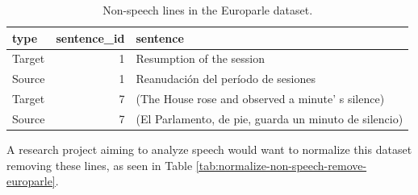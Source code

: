 \documentclass[
]{article}
\begin{document}
\begin{table}

\caption{\label{tab:normalize-non-speech-identify-europarle}Non-speech lines in the Europarle dataset.}
\centering
\begin{tabular}[t]{lrl}
\toprule
type & sentence\_id & sentence\\
\midrule
Target & 1 & Resumption of the session\\
Source & 1 & Reanudación del período de sesiones\\
Target & 7 & (The House rose and observed a minute' s silence)\\
Source & 7 & (El Parlamento, de pie, guarda un minuto de silencio)\\
\bottomrule
\end{tabular}
\end{table}

A research project aiming to analyze speech would want to normalize this dataset removing these lines, as seen in Table \ref{tab:normalize-non-speech-remove-europarle}.
\end{document}
